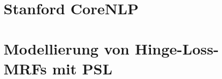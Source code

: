 \section{Stanford CoreNLP}%
\label{sec:theory:nlp}

\section{Modellierung von Hinge-Loss-MRFs mit PSL}%
\label{sec:theory:psl}
